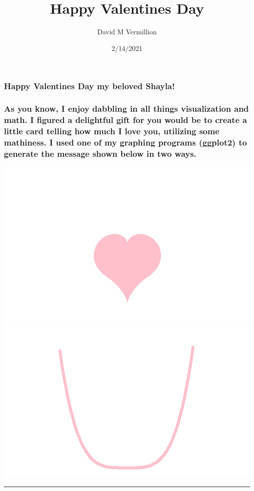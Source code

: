 \documentclass[
]{article}
\title{Happy Valentines Day}
\author{David M Vermillion}
\date{2/14/2021}
\begin{document}
\maketitle

\hypertarget{happy-valentines-day-my-beloved-shayla}{%
\subsubsection{Happy Valentines Day my beloved
Shayla!}\label{happy-valentines-day-my-beloved-shayla}}

\hypertarget{as-you-know-i-enjoy-dabbling-in-all-things-visualization-and-math.-i-figured-a-delightful-gift-for-you-would-be-to-create-a-little-card-telling-how-much-i-love-you-utilizing-some-mathiness.-i-used-one-of-my-graphing-programs-ggplot2-to-generate-the-message-shown-below-in-two-ways.}{%
\subsubsection{As you know, I enjoy dabbling in all things visualization
and math. I figured a delightful gift for you would be to create a
little card telling how much I love you, utilizing some mathiness. I
used one of my graphing programs (ggplot2) to generate the message shown
below in two
ways.}\label{as-you-know-i-enjoy-dabbling-in-all-things-visualization-and-math.-i-figured-a-delightful-gift-for-you-would-be-to-create-a-little-card-telling-how-much-i-love-you-utilizing-some-mathiness.-i-used-one-of-my-graphing-programs-ggplot2-to-generate-the-message-shown-below-in-two-ways.}}

\includegraphics[width=0.3\linewidth]{Heart2}
\includegraphics[width=0.3\linewidth]{U}

\begin{center}\rule{0.5\linewidth}{0.5pt}\end{center}
\end{document}
